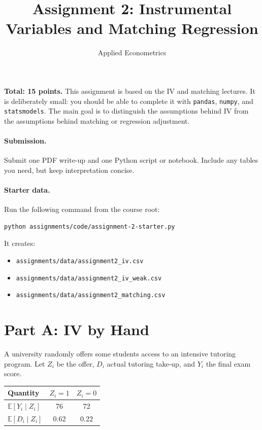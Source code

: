 \documentclass[11pt]{article}
\title{Assignment 2: Instrumental Variables and Matching Regression}
\author{Applied Econometrics}
\date{}
\newcommand{\E}{\mathbb{E}}
\begin{document}
\maketitle

\noindent\textbf{Total: 15 points.} This assignment is based on the IV and matching lectures. It is deliberately small: you should be able to complete it with \texttt{pandas}, \texttt{numpy}, and \texttt{statsmodels}. The main goal is to distinguish the assumptions behind IV from the assumptions behind matching or regression adjustment.

\paragraph{Submission.} Submit one PDF write-up and one Python script or notebook. Include any tables you need, but keep interpretation concise.

\paragraph{Starter data.} Run the following command from the course root:
\begin{lstlisting}
python assignments/code/assignment-2-starter.py
\end{lstlisting}
It creates:
\begin{itemize}
  \item \texttt{assignments/data/assignment2\_iv.csv}
  \item \texttt{assignments/data/assignment2\_iv\_weak.csv}
  \item \texttt{assignments/data/assignment2\_matching.csv}
\end{itemize}

\section*{Part A: IV by Hand}

A university randomly offers some students access to an intensive tutoring program. Let \(Z_i\) be the offer, \(D_i\) actual tutoring take-up, and \(Y_i\) the final exam score.

\begin{center}
\begin{tabular}{lcc}
\toprule
Quantity & \(Z_i=1\) & \(Z_i=0\) \\
\midrule
\(\E[Y_i\mid Z_i]\) & 76 & 72 \\
\(\E[D_i\mid Z_i]\) & 0.62 & 0.22 \\
\bottomrule
\end{tabular}
\end{center}
\end{document}
